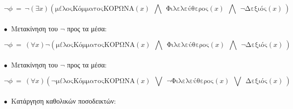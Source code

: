 \documentclass[10pt]{article}
\begin{document}
\[
\neg \phi \ = \ \neg  (\exists x)\left   ( \text{μέλοςΚόμματοςΚΟΡΩΝΑ}(x) \ \ \bigwedge \ \ \text{Φιλελεύθερος}(x) \ \ \bigwedge \ \ \neg \text{Δεξιός}(x) \ \right) \ \ \ \ \ \ \ \ \ \ \ \ \ \ \ \ \ \ \ \ \ \ \
\]\\

$\bullet \ $ Μετακίνηση του $\neg$ προς τα μέσα:

\[
\neg \phi \ = \ ( \forall x) \neg \left   ( \text{μέλοςΚόμματοςΚΟΡΩΝΑ}(x) \ \ \bigwedge \ \ \text{Φιλελεύθερος}(x) \ \ \bigwedge \ \ \neg \text{Δεξιός}(x) \ \right) \ \ \ \ \ \ \ \ \ \ \ \ \ \ \ \ \ \ \ \ \ \ \
\]\\

$\bullet \ $ Μετακίνηση του $\neg$ προς τα μέσα:

\[
\neg \phi \ = \ ( \forall x) \left   (\neg  \text{μέλοςΚόμματοςΚΟΡΩΝΑ}(x) \ \ \bigvee \ \ \neg  \text{Φιλελεύθερος}(x) \ \ \bigvee \ \ \text{Δεξιός}(x) \ \right) \ \ \ \ \ \ \ \ \ \ \ \ \ \ \ \ \ \ \ \ \ \ \
\]\\

$\bullet \ $ Κατάργηση καθολικών ποσοδεικτών:
\end{document}
